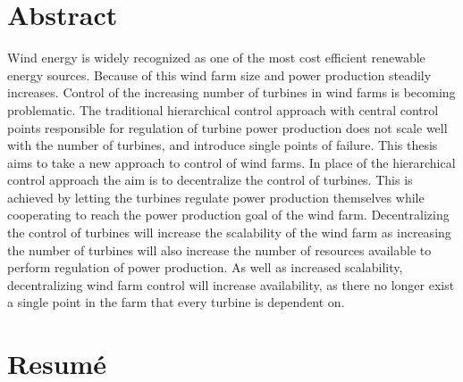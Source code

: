 
\chapter{Abstract}
Wind energy is widely recognized as one of the most cost efficient renewable energy sources. 
Because of this wind farm size and power production steadily increases.
Control of the increasing number of turbines in wind farms is becoming problematic.
%
The traditional hierarchical control approach with central control points responsible for regulation of turbine power production does not scale well with the number of turbines, and introduce single points of failure.
%
This thesis aims to take a new approach to control of wind farms.
%
In place of the hierarchical control approach the aim is to decentralize the control of turbines.
%
This is achieved by letting the turbines regulate power production themselves while cooperating to reach the power production goal of the wind farm.
Decentralizing the control of turbines will increase the scalability of the wind farm as increasing the number of turbines will also increase the number of resources available to perform regulation of power production.
%
As well as increased scalability, decentralizing wind farm control will increase availability, as there no longer exist a single point in the farm that every turbine is dependent on.

\chapter{Resumé}